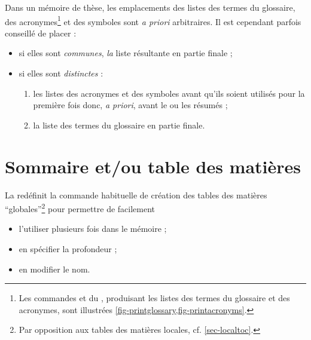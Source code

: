 
Dans un mémoire de thèse, les emplacements des listes des termes du glossaire,
des acronymes\footnote{Les commandes  et
   du , produisant les listes
  des termes du glossaire et des acronymes, sont illustrées
  \vref{fig-printglossary,fig-printacronyms}.} et des symboles sont \emph{a
  priori} arbitraires. Il est cependant parfois conseillé de placer :
\begin{itemize}
\item si elles sont \emph{communes}, \emph{la} liste résultante en partie finale ;
\item si elles sont \emph{distinctes} :
  \begin{enumerate}
  \item les listes des acronymes et des symboles avant qu'ils soient utilisés
    pour la première fois donc, \emph{a priori}, avant le ou les résumés ;
  \item la liste des termes du glossaire en partie finale.
  \end{enumerate}
\end{itemize}

\section{Sommaire et/ou table des matières}\label{sec-table-des-matieres}

La \yatCl{} redéfinit la commande  habituelle de
création des tables des matières \enquote{globales}\footnote{Par opposition aux
  tables des matières locales,
  cf. \vref{sec-localtoc}.} pour permettre de facilement
\begin{itemize}
\item l'utiliser plusieurs fois dans le mémoire ;
\item en spécifier la profondeur ;
\item en modifier le nom.
\end{itemize}

